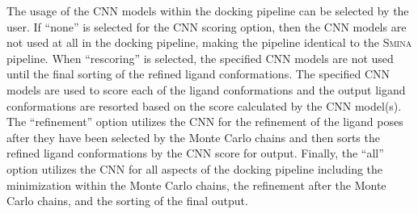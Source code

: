 \documentclass[journal=jcisd8,manuscript=article]{achemso}
\begin{document}
The usage of the CNN models within the docking pipeline can be selected by the user. If ``none'' is selected for the CNN scoring option, then the CNN models are not used at all in the docking pipeline, making the pipeline identical to the \textsc{Smina} pipeline. When ``rescoring'' is selected, the specified CNN models are not used until the final sorting of the refined ligand conformations. The specified CNN models are used to score each of the ligand conformations and the output ligand conformations are resorted based on the score calculated by the CNN model(s). The ``refinement'' option utilizes the CNN for the refinement of the ligand poses after they have been selected by the Monte Carlo chains and then sorts the refined ligand conformations by the CNN score for output. Finally, the ``all'' option utilizes the CNN for all aspects of the docking pipeline including the minimization within the Monte Carlo chains, the refinement after the Monte Carlo chains, and the sorting of the final output. 
\end{document}
